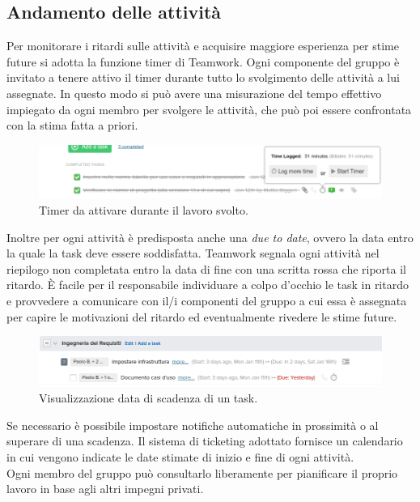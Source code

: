 \documentclass[a4paper]{report}
\begin{document}
			\subsection{Andamento delle attività}
				Per monitorare i ritardi sulle attività e acquisire maggiore esperienza per stime future si adotta la 
				funzione timer di Teamwork. Ogni componente del gruppo è invitato a tenere attivo il timer durante 
				tutto lo svolgimento delle attività a lui assegnate. In questo modo si può avere una misurazione del 
				tempo effettivo impiegato da ogni membro per svolgere le attività, che può poi essere confrontata con 
				la stima fatta a priori.
				\begin{figure}[H]
					\centering
					\includegraphics[scale=0.4]{teamworkTimer}
					\caption{Timer da attivare durante il lavoro svolto.}
				\end{figure}
				Inoltre per ogni attività è predisposta anche una \emph{due to date}, ovvero la data entro la quale la task deve 
				essere soddisfatta. Teamwork segnala ogni attività nel riepilogo non completata entro la data di fine con 
				una scritta rossa che riporta il ritardo. È facile per il responsabile individuare a colpo d'occhio le 
				task in ritardo e provvedere a comunicare con il/i componenti del gruppo a cui essa è assegnata per capire 
				le motivazioni del ritardo ed eventualmente rivedere le stime future.
				\begin{figure}[H]
					\centering
					\includegraphics[scale=0.4]{teamworkTaskinRitardo}
					\caption{Visualizzazione data di scadenza di un task.}
				\end{figure}
				Se necessario è possibile impostare notifiche automatiche in prossimità o al superare di una scadenza.
				Il sistema di ticketing adottato fornisce un calendario in cui vengono indicate le date stimate di inizio e fine
				di ogni attività.\\
				Ogni membro del gruppo può consultarlo liberamente per pianificare il proprio lavoro in base agli altri
				impegni privati.
				
\end{document}

